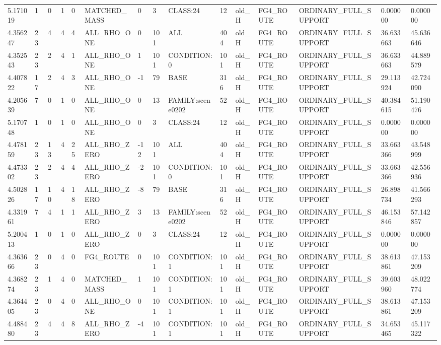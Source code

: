 \begin{tabular}{lllllllllllllll}
5.171019 & 1 & 0 & 1 & 0 & MATCHED\_MASS & 0 & 3 & CLASS:24 & 12 & old\_H & FG4\_ROUTE & ORDINARY\_FULL\_SUPPORT & 0.000000 & 0.000000 \\
4.356247 & 23 & 4 & 4 & 4 & ALL\_RHO\_ONE & 0 & 101 & ALL & 404 & old\_H & FG4\_ROUTE & ORDINARY\_FULL\_SUPPORT & 36.633663 & 45.636646 \\
4.352543 & 23 & 2 & 4 & 1 & ALL\_RHO\_ONE & 1 & 101 & CONDITION:0 & 101 & old\_H & FG4\_ROUTE & ORDINARY\_FULL\_SUPPORT & 36.633663 & 44.889579 \\
4.407822 & 17 & 2 & 4 & 3 & ALL\_RHO\_ONE & -1 & 79 & BASE & 316 & old\_H & FG4\_ROUTE & ORDINARY\_FULL\_SUPPORT & 29.113924 & 42.724090 \\
4.205639 & 7 & 0 & 1 & 0 & ALL\_RHO\_ONE & 0 & 13 & FAMILY:scene0202 & 52 & old\_H & FG4\_ROUTE & ORDINARY\_FULL\_SUPPORT & 40.384615 & 51.190476 \\
5.170748 & 1 & 0 & 1 & 0 & ALL\_RHO\_ONE & 0 & 3 & CLASS:24 & 12 & old\_H & FG4\_ROUTE & ORDINARY\_FULL\_SUPPORT & 0.000000 & 0.000000 \\
4.478159 & 23 & 13 & 4 & 25 & ALL\_RHO\_ZERO & -12 & 101 & ALL & 404 & old\_H & FG4\_ROUTE & ORDINARY\_FULL\_SUPPORT & 33.663366 & 43.548999 \\
4.473302 & 23 & 2 & 4 & 4 & ALL\_RHO\_ZERO & -2 & 101 & CONDITION:0 & 101 & old\_H & FG4\_ROUTE & ORDINARY\_FULL\_SUPPORT & 33.663366 & 42.556936 \\
4.502826 & 17 & 10 & 4 & 18 & ALL\_RHO\_ZERO & -8 & 79 & BASE & 316 & old\_H & FG4\_ROUTE & ORDINARY\_FULL\_SUPPORT & 26.898734 & 41.566293 \\
4.331961 & 7 & 4 & 1 & 1 & ALL\_RHO\_ZERO & 3 & 13 & FAMILY:scene0202 & 52 & old\_H & FG4\_ROUTE & ORDINARY\_FULL\_SUPPORT & 46.153846 & 57.142857 \\
5.200413 & 1 & 0 & 1 & 0 & ALL\_RHO\_ZERO & 0 & 3 & CLASS:24 & 12 & old\_H & FG4\_ROUTE & ORDINARY\_FULL\_SUPPORT & 0.000000 & 0.000000 \\
4.363666 & 23 & 0 & 4 & 0 & FG4\_ROUTE & 0 & 101 & CONDITION:1 & 101 & old\_H & FG4\_ROUTE & ORDINARY\_FULL\_SUPPORT & 38.613861 & 47.153209 \\
4.368274 & 23 & 1 & 4 & 0 & MATCHED\_MASS & 1 & 101 & CONDITION:1 & 101 & old\_H & FG4\_ROUTE & ORDINARY\_FULL\_SUPPORT & 39.603960 & 48.022774 \\
4.364405 & 23 & 0 & 4 & 0 & ALL\_RHO\_ONE & 0 & 101 & CONDITION:1 & 101 & old\_H & FG4\_ROUTE & ORDINARY\_FULL\_SUPPORT & 38.613861 & 47.153209 \\
4.488480 & 23 & 4 & 4 & 8 & ALL\_RHO\_ZERO & -4 & 101 & CONDITION:1 & 101 & old\_H & FG4\_ROUTE & ORDINARY\_FULL\_SUPPORT & 34.653465 & 45.117322 \\

\end{tabular}
